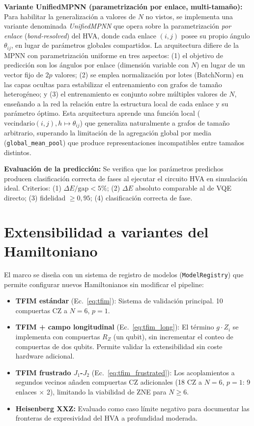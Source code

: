 \documentclass[11pt,a4paper,spanish]{book}
\begin{document}
\textbf{Variante UnifiedMPNN (parametrización por enlace, multi-tamaño):} Para habilitar la generalización a valores de $N$ no vistos, se implementa una variante denominada \emph{UnifiedMPNN} que opera sobre la parametrización \emph{por enlace} (\emph{bond-resolved}) del HVA, donde cada enlace $(i,j)$ posee su propio ángulo $\theta_{ij}$, en lugar de parámetros globales compartidos. La arquitectura difiere de la MPNN con parametrización uniforme en tres aspectos: (1) el objetivo de predicción son los ángulos por enlace (dimensión variable con $N$) en lugar de un vector fijo de $2p$ valores; (2) se emplea normalización por lotes (BatchNorm) en las capas ocultas para estabilizar el entrenamiento con grafos de tamaño heterogéneo; y (3) el entrenamiento es conjunto sobre múltiples valores de $N$, enseñando a la red la relación entre la estructura local de cada enlace y su parámetro óptimo. Esta arquitectura aprende una función local ($\text{vecindario}(i,j), h \mapsto \theta_{ij}$) que generaliza naturalmente a grafos de tamaño arbitrario, superando la limitación de la agregación global por media (\texttt{global\_mean\_pool}) que produce representaciones incompatibles entre tamaños distintos.

\textbf{Evaluación de la predicción:} Se verifica que los parámetros predichos producen clasificación correcta de fases al ejecutar el circuito HVA en simulación ideal. Criterios: (1) $\Delta E/\text{gap} < 5\%$; (2) $\Delta E$ absoluto comparable al de VQE directo; (3) fidelidad $\geq 0,95$; (4) clasificación correcta de fase.

\section{Extensibilidad a variantes del Hamiltoniano}

El marco se diseña con un sistema de registro de modelos (\texttt{ModelRegistry}) que permite configurar nuevos Hamiltonianos sin modificar el pipeline:

\begin{itemize}
    \item \textbf{TFIM estándar} (Ec.~\ref{eq:tfim}): Sistema de validación principal. 10 compuertas CZ a $N = 6$, $p = 1$.
    \item \textbf{TFIM + campo longitudinal} (Ec.~\ref{eq:tfim_long}): El término $g \cdot Z_i$ se implementa con compuertas $R_Z$ (un qubit), sin incrementar el conteo de compuertas de dos qubits. Permite validar la extensibilidad sin coste hardware adicional.
    \item \textbf{TFIM frustrado $J_1$-$J_2$} (Ec.~\ref{eq:tfim_frustrated}): Los acoplamientos a segundos vecinos añaden compuertas CZ adicionales (18 CZ a $N = 6$, $p = 1$: 9 enlaces $\times$ 2), limitando la viabilidad de ZNE para $N \geq 6$.
    \item \textbf{Heisenberg XXZ:} Evaluado como caso límite negativo para documentar las fronteras de expresividad del HVA a profundidad moderada.
\end{itemize}
\end{document}
